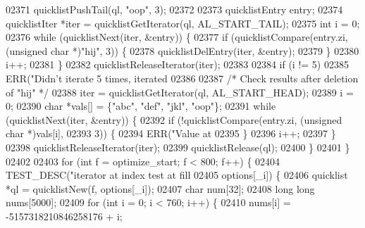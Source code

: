 \begin{DoxyCode}
{{{{{{{{{{{{{{{{{{{{{{{{{{{{{{{{{{{{{{{{{{{{{{{{{{{{{{{{{{{{{{{{{{{{{{{{{{{{{{{{{{{{{{02371                 quicklistPushTail(ql, \textcolor{stringliteral}{"oop"}, 3);
02372 
02373                 quicklistEntry entry;
02374                 quicklistIter *iter = quicklistGetIterator(ql, AL\_START\_TAIL);
02375                 \textcolor{keywordtype}{int} i = 0;
02376                 \textcolor{keywordflow}{while} (quicklistNext(iter, &entry)) \{
02377                     \textcolor{keywordflow}{if} (quicklistCompare(entry.zi, (\textcolor{keywordtype}{unsigned} \textcolor{keywordtype}{char} *)\textcolor{stringliteral}{"hij"}, 3)) \{
02378                         quicklistDelEntry(iter, &entry);
02379                     \}
02380                     i++;
02381                 \}
02382                 quicklistReleaseIterator(iter);
02383 
02384                 \textcolor{keywordflow}{if} (i != 5)
02385                     ERR(\textcolor{stringliteral}{"Didn't iterate 5 times, iterated %
02386 
02387                 \textcolor{comment}{/* Check results after deletion of "hij" */}
02388                 iter = quicklistGetIterator(ql, AL\_START\_HEAD);
02389                 i = 0;
02390                 \textcolor{keywordtype}{char} *vals[] = \{\textcolor{stringliteral}{"abc"}, \textcolor{stringliteral}{"def"}, \textcolor{stringliteral}{"jkl"}, \textcolor{stringliteral}{"oop"}\};
02391                 \textcolor{keywordflow}{while} (quicklistNext(iter, &entry)) \{
02392                     \textcolor{keywordflow}{if} (!quicklistCompare(entry.zi, (\textcolor{keywordtype}{unsigned} \textcolor{keywordtype}{char} *)vals[i],
02393                                           3)) \{
02394                         ERR(\textcolor{stringliteral}{"Value at %
02395                     \}
02396                     i++;
02397                 \}
02398                 quicklistReleaseIterator(iter);
02399                 quicklistRelease(ql);
02400             \}
02401         \}
02402 
02403         \textcolor{keywordflow}{for} (\textcolor{keywordtype}{int} f = optimize\_start; f < 800; f++) \{
02404             TEST\_DESC(\textcolor{stringliteral}{"iterator at index test at fill %
02405                       options[\_i]) \{
02406                 quicklist *ql = quicklistNew(f, options[\_i]);
02407                 \textcolor{keywordtype}{char} num[32];
02408                 \textcolor{keywordtype}{long} \textcolor{keywordtype}{long} nums[5000];
02409                 \textcolor{keywordflow}{for} (\textcolor{keywordtype}{int} i = 0; i < 760; i++) \{
02410                     nums[i] = -5157318210846258176 + i;
}}}}}}}}}}}}}}}}}}}}}}}}}}}}}}}}}}}}}}}}}}}}}}}}}}}}}}}}}}}}}}}}}}}}}}}}}}}}}}}}}}}}}}}}}
\end{DoxyCode}

